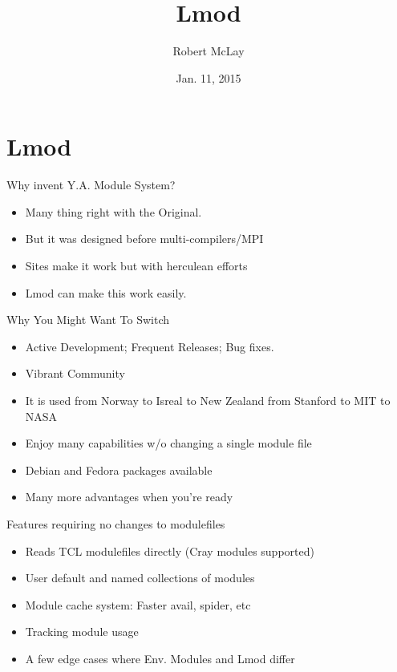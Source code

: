 \documentclass{beamer}
\title{Lmod}
\author{Robert McLay}
\institute{The Texas Advanced Computing Center}
\date{Jan. 11, 2015}  %
\begin{document}
\begin{frame}
  \titlepage
\end{frame}

\section{Lmod}

\begin{frame}{Why invent Y.A. Module System?}
  \begin{itemize}
    \item Many thing right with the Original.
    \item But it was designed before multi-compilers/MPI
    \item Sites make it work but with herculean efforts
    \item Lmod can make this work easily.
  \end{itemize}
\end{frame}


\begin{frame}{Why You Might Want To Switch}
  \begin{itemize}
    \item Active Development;  Frequent Releases; Bug fixes.
    \item Vibrant Community
    \item It is used from Norway to Isreal to New Zealand from Stanford to MIT to NASA
    \item Enjoy many capabilities w/o changing a single module file
    \item Debian and Fedora packages available
    \item Many more advantages when you're ready
  \end{itemize}
\end{frame}

\begin{frame}{Features requiring no changes to modulefiles}
  \begin{itemize}
    \item Reads TCL modulefiles directly (Cray modules supported)
    \item User default and named collections of modules
    \item Module cache system: Faster avail, spider, etc
    \item Tracking module usage 
    \item A few edge cases where Env. Modules and Lmod differ
  \end{itemize}
\end{frame}
\end{document}
